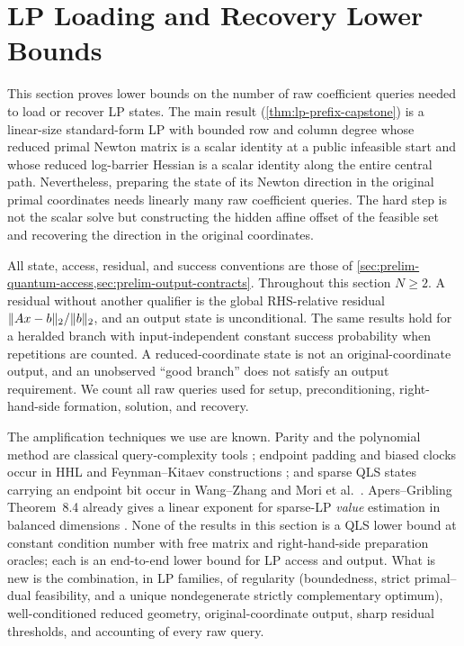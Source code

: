 \section{LP Loading and Recovery Lower Bounds}
\label{sec:lp-hardness}

This section proves lower bounds on the number of raw coefficient queries
needed to load or recover LP states.  The main result
(\cref{thm:lp-prefix-capstone}) is a linear-size standard-form LP with bounded
row and column degree whose reduced primal Newton matrix is a scalar identity
at a public infeasible start and whose reduced log-barrier Hessian is a scalar
identity along the entire central path.  Nevertheless, preparing the state of
its Newton direction in the original primal coordinates needs linearly many
raw coefficient queries.  The hard step is not the scalar solve but
constructing the hidden affine offset of the feasible set and recovering the
direction in the original coordinates.

All state, access, residual, and success conventions are those of
\cref{sec:prelim-quantum-access,sec:prelim-output-contracts}.  Throughout
this section \(N\geq2\).  A residual without another qualifier is the global
RHS-relative residual \(\lVert Ax-b\rVert_2/\lVert b\rVert_2\), and an output state is
unconditional.  The same results hold for a heralded branch with
input-independent constant success probability when repetitions are counted.
A reduced-coordinate state is not an original-coordinate output, and an unobserved ``good branch'' does not satisfy an output requirement.  We
count all raw queries used for setup, preconditioning, right-hand-side
formation, solution, and recovery.

The amplification techniques we use are known.  Parity and the
polynomial method are classical query-complexity tools
\cite{beals2001-quantum-lower-bounds-by-polynomials}; endpoint padding and
biased clocks occur in HHL and Feynman--Kitaev constructions
\cite{harrow2009-quantum-algorithm-linear-systems-equations,caha2018-feynman-kitaev-clock,bausch2018-analysis-limitations-modified-circuit};
and sparse QLS states carrying an endpoint bit occur in Wang--Zhang and Mori
et al.\ \cite{wang2024-tight-quantum-depth-lower-bound,mori2026-sparsity-dependent-complexity-lower-bound}.
Apers--Gribling Theorem~8.4 already gives a linear exponent for sparse-LP
\emph{value} estimation in balanced dimensions
\cite{apers2026-quantum-speedups-linear-programming-interior}.  None of the
results in this section is a QLS lower bound at constant condition number
with free matrix and right-hand-side preparation oracles; each is an
end-to-end lower bound for LP access and output.  What is new is the combination, in LP families, of regularity
(boundedness, strict primal--dual feasibility, and a unique nondegenerate
strictly complementary optimum), well-conditioned reduced geometry,
original-coordinate output, sharp residual thresholds, and accounting of every
raw query.

